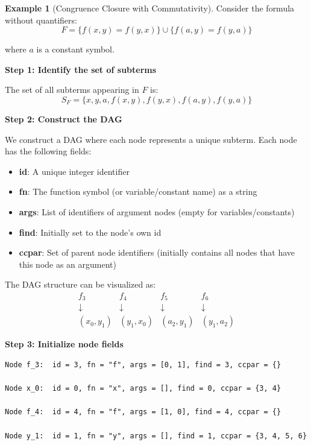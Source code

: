 \documentclass[11pt,a4paper]{article}
\theoremstyle{definition}
\newtheorem{example}{Example}[section]
\theoremstyle{plain}
\theoremstyle{remark}
\begin{document}
\begin{example}[Congruence Closure with Commutativity]
Consider the formula without quantifiers:
\[
F = \{f(x, y) = f(y, x)\} \cup \{f(a, y) = f(y, a)\}
\]

where $a$ is a constant symbol.

\textbf{Step 1: Identify the set of subterms}

The set of all subterms appearing in $F$ is:
\[
S_F = \{x, y, a, f(x, y), f(y, x), f(a, y), f(y, a)\}
\]

\textbf{Step 2: Construct the DAG}

We construct a DAG where each node represents a unique subterm. Each node has the following fields:
\begin{itemize}
    \item \textbf{id}: A unique integer identifier
    \item \textbf{fn}: The function symbol (or variable/constant name) as a string
    \item \textbf{args}: List of identifiers of argument nodes (empty for variables/constants)
    \item \textbf{find}: Initially set to the node's own id
    \item \textbf{ccpar}: Set of parent node identifiers (initially contains all nodes that have this node as an argument)
\end{itemize}

The DAG structure can be visualized as:
\[
\begin{array}{cccc}
f_3 & f_4 & f_5 & f_6 \\
\downarrow & \downarrow & \downarrow & \downarrow \\
(x_0, y_1) & (y_1, x_0) & (a_2, y_1) & (y_1, a_2)
\end{array}
\]

\textbf{Step 3: Initialize node fields}

\begin{tcolorbox}[colback=blue!5!white,colframe=blue!75!black,title=\textbf{Initial DAG Node Configuration}]
\begin{verbatim}
Node f_3:  id = 3, fn = "f", args = [0, 1], find = 3, ccpar = {}

Node x_0:  id = 0, fn = "x", args = [], find = 0, ccpar = {3, 4}

Node f_4:  id = 4, fn = "f", args = [1, 0], find = 4, ccpar = {}

Node y_1:  id = 1, fn = "y", args = [], find = 1, ccpar = {3, 4, 5, 6}


\end{verbatim}
\end{tcolorbox}
\end{example}
\end{document}
